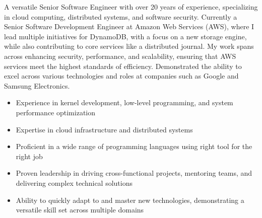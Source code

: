 



A versatile Senior Software Engineer with over 20 years of experience, specializing in cloud computing, distributed systems, and software security. Currently a Senior Software Development Engineer at Amazon Web Services (AWS), where I lead multiple initiatives for DynamoDB, with a focus on a new storage engine, while also contributing to core services like a distributed journal. My work spans across enhancing security, performance, and scalability, ensuring that AWS services meet the highest standards of efficiency. Demonstrated the ability to excel across various technologies and roles at companies such as Google and Samsung Electronics.

\begin{cvparagraph}
\begin{itemize}
  \item Experience in kernel development, low-level programming, and system performance optimization
  \item Expertise in cloud infrastructure and distributed systems
  \item Proficient in a wide range of programming languages using right tool for the right job
  \item Proven leadership in driving cross-functional projects, mentoring teams, and delivering complex technical solutions
  \item Ability to quickly adapt to and master new technologies, demonstrating a versatile skill set across multiple domains
\end{itemize}

\end{cvparagraph}
